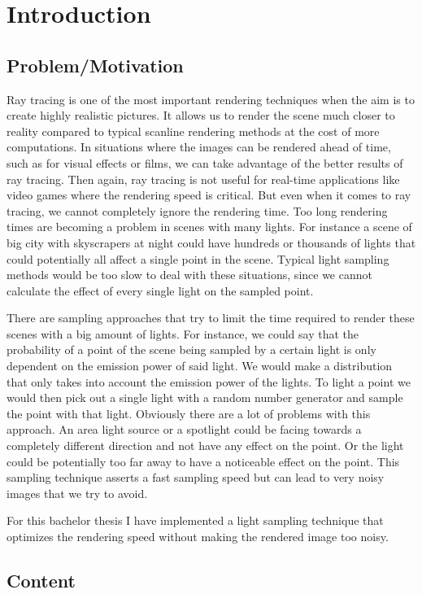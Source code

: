 
\chapter{Introduction}
\label{ch:Introduction}

\section{Problem/Motivation}
\label{sec:Introduction:Motivation}

Ray tracing is one of the most important rendering techniques when the aim is to create highly realistic pictures. It allows us to render the scene much closer to reality compared to typical scanline rendering methods at the cost of more computations. In situations where the images can be rendered ahead of time, such as for visual effects or films, we can take advantage of the better results of ray tracing. Then again, ray tracing is not useful for real-time applications like video games where the rendering speed is critical. But even when it comes to ray tracing, we cannot completely ignore the rendering time. Too long rendering times are becoming a problem in scenes with many lights. For instance a scene of big city with skyscrapers at night could have hundreds or thousands of lights that could potentially all affect a single point in the scene. Typical light sampling methods would be too slow to deal with these situations, since we cannot calculate the effect of every single light on the sampled point.\cite{PBR}\cite{MLA}\cite{MLS}\cite{LCT}

There are sampling approaches that try to limit the time required to render these scenes with a big amount of lights. For instance, we could say that the probability of a point of the scene being sampled by a certain light is only dependent on the emission power of said light. We would make a distribution that only takes into account the emission power of the lights. To light a point we would then pick out a single light with a random number generator and sample the point with that light. Obviously there are a lot of problems with this approach. An area light source or a spotlight could be facing towards a completely different direction and not have any effect on the point. Or the light could be potentially too far away to have a noticeable effect on the point. This sampling technique asserts a fast sampling speed but can lead to very noisy images that we try to avoid.

For this bachelor thesis I have implemented a light sampling technique that optimizes the rendering speed without making the rendered image too noisy.

\section{Content}
\label{sec:Introduction:Content}